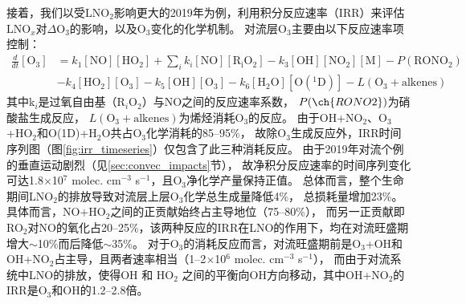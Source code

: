 
接着，我们以受LNO$_2$影响更大的2019年为例，利用积分反应速率（IRR）来评估LNO$_x$对$\Delta$O$_3$的影响，以及O$_3$变化的化学机制。
对流层O$_3$主要由以下反应速率项控制\citep{Mazzuca.2016}：
{
\abovedisplayskip=3pt%
\belowdisplayskip=3pt%
\begingroup
\allowdisplaybreaks
\begin{align}
  \frac{d}{dt}[\mathrm{O_3}] &= k_1[\mathrm{NO}][\mathrm{HO_2}] + \sum_{i}  k_i[\mathrm{NO}][\mathrm{R_iO_2}] - k_3[\mathrm{OH}][\mathrm{NO_2}][\mathrm{M}] - P(\mathrm{RONO_2}) \nonumber \\
                             & - k_4[\mathrm{HO_2}][\mathrm{O_3}] - k_5[\mathrm{OH}][\mathrm{O_3}] - k_6[\mathrm{H_2O}][\mathrm{O(^1D)}] - L(\mathrm{O_3+alkenes})
\end{align}
\endgroup
}
其中k$_i$是过氧自由基（R$_i$O$_2$）与NO之间的反应速率系数，
$P(\ch{RONO2})$为硝酸盐生成反应，
$L(\mathrm{O_3+alkenes})$为烯烃消耗O$_3$的反应。
由于OH+NO$_2$、O$_3$+HO$_2$和O(1D)+H$_2$O共占O$_3$化学消耗的85--95\%，
故除O$_3$生成反应外，IRR时间序列图（图\ref{fig:irr_timeseries}）仅包含了此三种消耗反应。
由于2019年对流个例的垂直运动剧烈（见\ref{sec:convec_impacts}节），
故净积分反应速率的时间序列变化可达1.8$\times$10$^7$ molec. cm$^{-3}$ s$^{-1}$，且O$_3$净化学产量保持正值。
总体而言，整个生命期间LNO$_2$的排放导致对流层上层O$_3$化学总生成量降低4\%，
总损耗量增加23\%。
具体而言，NO+HO$_2$之间的正贡献始终占主导地位（75--80\%），
而另一正贡献即RO$_2$对NO的氧化占20--25\%，该两种反应的IRR在LNO的作用下，均在对流旺盛期增大$\sim$10\%而后降低$\sim$35\%。
对于O$_3$的消耗反应而言，对流旺盛期前是O$_3$+OH和OH+NO$_2$占主导，且两者速率相当（1--2$\times$10$^6$ molec. cm$^{-3}$ s$^{-1}$），
而由于对流系统中LNO的排放，使得OH 和 HO$_2$ 之间的平衡向OH方向移动，其中OH+NO$_2$的IRR是O$_3$和OH的1.2--2.8倍。


